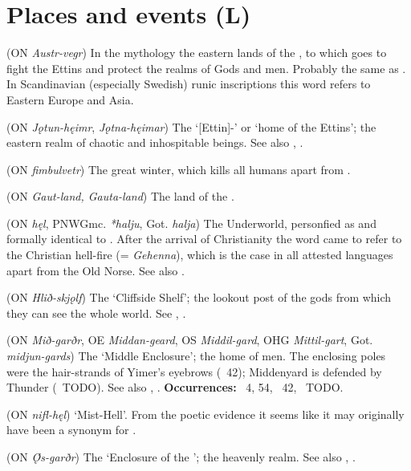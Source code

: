 \section{Places and events (L)}
\begin{itemize}

 (ON \emph{Austr-vegr})
  In the mythology the eastern lands of the , to which  goes to fight the Ettins and protect the realms of Gods and men.  Probably the same as .
  In Scandinavian (especially Swedish) runic inscriptions this word refers to Eastern Europe and Asia.

 (ON \emph{Jǫtun-hęimr}, \emph{Jǫtna-hęimar})
  The ‘[Ettin]-’ or ‘home of the Ettins’; the eastern realm of chaotic and inhospitable beings.  See also , .

 (ON \emph{fimbulvetr})
  The great winter, which kills all humans apart from .

 (ON \emph{Gaut-land, Gauta-land})
  The land of the .

 (ON \emph{hęl}, PNWGmc. \emph{*halju}, Got. \emph{halja})
  The Underworld, personfied as and formally identical to .  After the arrival of Christianity the word came to refer to the Christian hell-fire (= \emph{Gehenna}), which is the case in all attested languages apart from the Old Norse.  See also .

 (ON \emph{Hlið-skjǫlf})
  The ‘Cliffside Shelf’; the lookout post of the gods from which they can see the whole world.  See \Grimnismal, \Skirnismal.

 (ON \emph{Mið-garðr}, OE \emph{Middan-geard}, OS \emph{Middil-gard}, OHG \emph{Mittil-gart}, Got. \emph{midjun-gards})
  The ‘Middle Enclosure’; the home of men.  The enclosing poles were the hair-strands of Yimer’s eyebrows (\Grimnismal\ 42); Middenyard is defended by Thunder (\Harbardsljod\ TODO).  See also , .
  \textbf{Occurrences:} \Voluspa\ 4, 54, \Grimnismal\ 42, \Harbardsljod\ TODO.

 (ON \emph{nifl-hęl})
  ‘Mist-Hell’. From the poetic evidence it seems like it may originally have been a synonym for .

 (ON \emph{Ǫ́s-garðr})
  The ‘Enclosure of the ’; the heavenly realm.  See also , .


\end{itemize}
